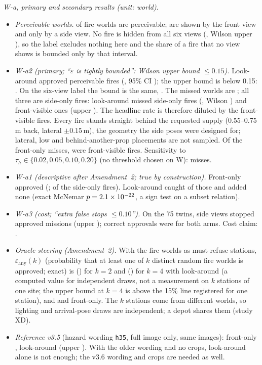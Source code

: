 \documentclass[conference]{IEEEtran}
\newcommand{\tauh}{\tau_{h}}
\begin{document}
\emph{W-a, primary and secondary results (unit: world).}
\begin{itemize}\setlength\itemsep{0pt}
\item \emph{Perceivable worlds.} \WNPerc{} of \WNPerc{} fire worlds are perceivable; \WNFront{} are shown by the front view and \WNSideOnly{} only by a side view. No fire is hidden from all six views (\WNotVisible, Wilson upper \WNotVisibleUpper), so the label excludes nothing here and the share of a fire that no view shows is bounded only by that interval.
\item \emph{W-a2 (primary; ``$\varepsilon$ is tightly bounded'': Wilson upper bound $\le0.15$).} Look-around approved \WMissLA{} perceivable fires (\WMissLARate, 95\% CI \WMissLACI); the upper bound \WMissLAUpper{} is below 0.15: \WClaimEps. On the six-view label the bound is the same, \WSixViewUpper. The missed worlds are \WMissedWorlds{}; all three are side-only fires: look-around missed \WMissLASide{} side-only fires (\WMissLASideRate, Wilson \WMissLASideCI) and \WMissLAFront{} front-visible ones (upper \WMissLAFrontUpper). The headline rate is therefore diluted by the \WNFront{} front-visible fires. Every fire stands straight behind the requested supply (0.55--0.75\,m back, lateral $\pm0.15$\,m), the geometry the side poses were designed for; lateral, low and behind-another-prop placements are not sampled. Of the \WMissFront{} front-only misses, \WMissFrontVis{} were front-visible fires. Sensitivity to $\tauh\in\{0.02,0.05,0.10,0.20\}$ (no threshold chosen on W): \WTauMiss{} misses.
\item \emph{W-a1 (descriptive after Amendment~2; true by construction).} Front-only approved \WMissFront{} (\WMissFrontRate; \WMissFrontSide{} of the side-only fires). Look-around caught \WCaughtOnlyByLA{} of those and added none (exact McNemar $p=2.1\times10^{-22}$, a sign test on a subset relation).
\item \emph{W-a3 (cost; ``extra false stops $\le0.10$'').} On the 75 twins, side views stopped \WExtraStop{} approved missions (upper \WExtraStopUpper); correct approvals were \WTwinCA{} for both arms. Cost claim: \WClaimCost.
\item \emph{Oracle steering (Amendment~2).} With the \WNPerc{} fire worlds as must-refuse stations, $\varepsilon_{\mathrm{any}}(k)$ (probability that at least one of $k$ distinct random fire worlds is approved; exact) is \WEpsAnyTwo{} (\WEpsAnyTwoCI) for $k=2$ and \WEpsAnyFour{} (\WEpsAnyFourCI) for $k=4$ with look-around (a computed value for independent draws, not a measurement on $k$ stations of one site; the upper bound at $k=4$ is above the 15\% line registered for one station), and \WEpsAnyTwoFront{} and \WEpsAnyFourFront{} front-only. The $k$ stations come from different worlds, so lighting and arrival-pose draws are independent; a depot shares them (study XD).
\item \emph{Reference v3.5} (hazard wording \texttt{h35}, full image only, same images): front-only \WVOldMissFront{}, look-around \WVOldMissLA{} (upper \WVOldMissLAUpper). With the older wording and no crops, look-around alone is not enough; the v3.6 wording and crops are needed as well.
\end{itemize}
\end{document}
